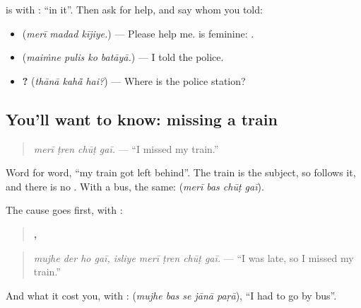 \textbf{} is \textbf{} with \textbf{}: \textquotedblleft{}in it\textquotedblright{}. Then ask for help, and say whom you told:

\begin{itemize}
\raggedright
  \item \textbf{  } (\emph{merī madad kījiye.}) — Please help me. \textbf{} is feminine: \textbf{}.
  \item \textbf{   } (\emph{maiṁne pulis ko batāyā.}) — I told the police.
  \item \textbf{  ?} (\emph{thānā kahā̃ hai?}) — Where is the police station?
\end{itemize}

\subsection*{You'll want to know: missing a train}
\begin{quote}
\textbf{   }
\end{quote}

\begin{quote}
\emph{merī ṭren chūṭ gaī.} — \textquotedblleft{}I missed my train.\textquotedblright{}
\end{quote}

Word for word, \textquotedblleft{}my train got left behind\textquotedblright{}. The train is the subject, so \textbf{ } follows it, and there is no \textbf{}. With a bus, the same: \textbf{   } (\emph{merī bas chūṭ gaī}).

The cause goes first, with \textbf{}:

\begin{quote}
\textbf{   ,     }
\end{quote}

\begin{quote}
\emph{mujhe der ho gaī, isliye merī ṭren chūṭ gaī.} — \textquotedblleft{}I was late, so I missed my train.\textquotedblright{}
\end{quote}

And what it cost you, with \textbf{}: \textbf{    } (\emph{mujhe bas se jānā paṛā}), \textquotedblleft{}I had to go by bus\textquotedblright{}.

